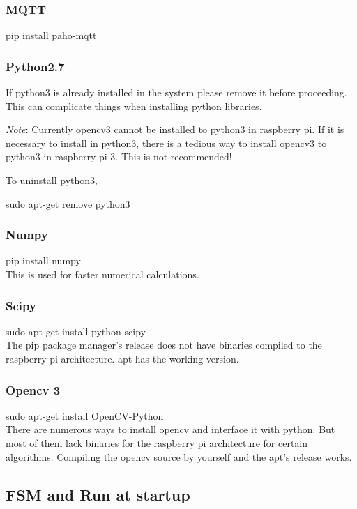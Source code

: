 \documentclass{report}
\begin{document}
\subsubsection{MQTT}
pip install paho-mqtt
\subsubsection{Python2.7}
If python3 is already installed in the system please remove it before proceeding. This can complicate things when installing python libraries.\newline

\emph{Note}: Currently opencv3 cannot be installed to python3 in raspberry pi. If it is necessary to install in python3, there is a tedious way to install opencv3 to python3 in raspberry pi 3. This is not recommended!\newline

To uninstall python3,\newline

sudo apt-get remove python3

\subsubsection{Numpy}
pip install numpy\\
This is used for faster numerical calculations.

\subsubsection{Scipy}
sudo apt-get install python-scipy\\
The pip package manager's release does not have binaries compiled to the raspberry pi architecture. apt has the working version.

\subsubsection{Opencv 3}
sudo apt-get install OpenCV-Python\\
There are numerous ways to install opencv and interface it with python. But most of them lack binaries for the raspberry pi architecture for certain algorithms. Compiling the opencv source by yourself and the apt's release works.



\subsection{FSM and Run at startup}  
\end{document}
